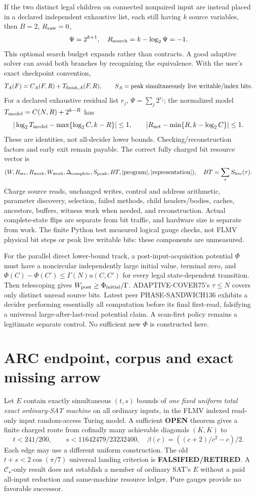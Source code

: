 \documentclass[11pt]{article}
\begin{document}
If the two distinct legal children on connected
nonpaired input are instead placed in a declared
independent exhaustive list, each still having $k$
source variables, then $B=2$, $R_{\rm raw}=0$,
\[
\Psi=2^{k+1},\quad R_{\rm search}=k-\log_2\Psi=-1.
\]
This optional search budget expands rather than
contracts. A good adaptive solver can avoid both
branches by recognizing the equivalence. With the
user's exact checkpoint convention,
\[
T_A(F)=C_A(F,R)+T_{{\rm finish},A}(F,R),\qquad
S_A=\text{peak simultaneously live writable/index bits}.
\]
For a declared exhaustive residual list $r_j$,
$\Psi=\sum_j2^{r_j}$; the normalized model
$T_{\rm model}=C(N,R)+2^{k-R}$ has
\[
|\log_2T_{\rm model}-\max\{\log_2 C,k-R\}|\le1,\qquad
|R_{\rm net}-\min\{R,k-\log_2 C\}|\le1.
\]
These are identities, not all-decider lower bounds.
Checking/reconstruction factors and early exit remain payable.
The correct fully charged bit resource vector is
\[
(W,R_{\rm src},R_{\rm work},W_{\rm work},
\Delta_{\rm complete},S_{\rm peak},BT,
|{\rm program}|,|{\rm representation}|),\quad
BT=\sum_\tau S_{\rm live}(\tau).
\]
Charge source reads, unchanged writes, control and address
arithmetic, parameter discovery, selection, failed methods,
child headers/bodies, caches, ancestors, buffers, witness
work when needed, and reconstruction. Actual complete-state
flips are separate from bit traffic, and hardware size is
separate from work. The finite Python test measured
logical gauge checks, not FLMV physical bit steps or
peak live writable bits: these components are unmeasured.

For the parallel direct lower-bound track, a post-input-acquisition
potential $\Phi$ must have a noncircular independently
large initial value, terminal zero, and
$\Phi(C)-\Phi(C')\le\Gamma(N)u(C,C')$
for every legal state-dependent transition.
Then telescoping gives $W_{\rm post}\ge\Phi_{\rm initial}/\Gamma$.
ADAPTIVE-COVER75's $\tau\le N$ covers only distinct
unread source bits. Latest peer PHASE-SANDWICH136
exhibits a decider performing essentially all
computation before its final first-read, falsifying
a universal large-after-last-read potential claim.
A scan-first policy remains a legitimate separate
control. No sufficient new $\Phi$ is constructed here.

\section{ARC endpoint, corpus and exact missing arrow}
Let $E$ contain exactly simultaneous $(t,s)$ bounds
of \emph{one fixed uniform total exact ordinary-SAT machine}
on all ordinary inputs, in the FLMV indexed read-only
input random-access Turing model. A sufficient
\textbf{OPEN} theorem gives a finite charged route
from cofinally many achievable diagonals $(K,K)$ to
\[
t<241/200,\qquad s<11642479/23232400,\quad
\beta(c)=((c+2)/c^2-c)/2.
\]
Each edge may use a different uniform construction.
The old $t+s<2\cos(\pi/7)$ universal landing
criterion is \textbf{FALSIFIED/RETIRED}.
A $\mathcal C_\star$-only result does not establish
a member of ordinary SAT's $E$ without a paid
all-input reduction and same-machine resource ledger.
Pure gauges provide no favorable successor.
\end{document}
